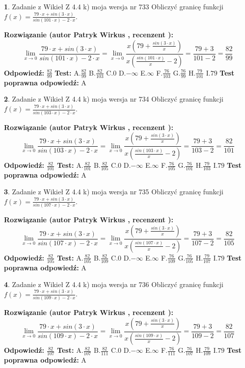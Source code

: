 \documentclass[12pt, a4paper]{article}
\theoremstyle{definition} %
\newtheorem{zad}{}
\newcommand{\zadStart}[1]{\begin{zad}#1\newline}
\newcommand{\zadStop}{\end{zad}}
\newcommand{\rozwStart}[2]{\noindent \textbf{Rozwiązanie (autor #1 , recenzent #2): }\newline}
\newcommand{\rozwStop}{\newline}
\newcommand{\odpStart}{\noindent \textbf{Odpowiedź:}\newline}
\newcommand{\odpStop}{\newline}
\newcommand{\testStart}{\noindent \textbf{Test:}\newline}
\newcommand{\testStop}{\newline}
\newcommand{\kluczStart}{\noindent \textbf{Test poprawna odpowiedź:}\newline}
\newcommand{\kluczStop}{\newline}
\begin{document}
\zadStart{Zadanie z Wikieł Z 4.4 k) moja wersja nr 733}
Obliczyć granicę funkcji $f(x)=\frac{79\cdot x +sin(3\cdot x)}{sin(101\cdot x) -2\cdot x}$.
\zadStop
\rozwStart{Patryk Wirkus}{}
$$\lim\limits_{x\to 0}\frac{79\cdot x +sin(3\cdot x)}{sin(101\cdot x) -2\cdot x}
=\lim\limits_{x\to 0}\frac{x(79+\frac{sin(3\cdot x)}{x})}{x(\frac{sin(101\cdot x)}{x}-2)}
=\frac{79+3}{101-2} = \frac{82}{99}$$
\rozwStop
\odpStart
$\frac{82}{99}$
\odpStop
\testStart
A.$\frac{82}{99}$
B.$\frac{82}{103}$
C.$0$
D.$-\infty$
E.$\infty$
F.$\frac{76}{103}$
G.$\frac{76}{99}$
H.$\frac{79}{101}$
I.$79$
\testStop
\kluczStart
A
\kluczStop



\zadStart{Zadanie z Wikieł Z 4.4 k) moja wersja nr 734}
Obliczyć granicę funkcji $f(x)=\frac{79\cdot x +sin(3\cdot x)}{sin(103\cdot x) -2\cdot x}$.
\zadStop
\rozwStart{Patryk Wirkus}{}
$$\lim\limits_{x\to 0}\frac{79\cdot x +sin(3\cdot x)}{sin(103\cdot x) -2\cdot x}
=\lim\limits_{x\to 0}\frac{x(79+\frac{sin(3\cdot x)}{x})}{x(\frac{sin(103\cdot x)}{x}-2)}
=\frac{79+3}{103-2} = \frac{82}{101}$$
\rozwStop
\odpStart
$\frac{82}{101}$
\odpStop
\testStart
A.$\frac{82}{101}$
B.$\frac{82}{105}$
C.$0$
D.$-\infty$
E.$\infty$
F.$\frac{76}{105}$
G.$\frac{76}{101}$
H.$\frac{79}{103}$
I.$79$
\testStop
\kluczStart
A
\kluczStop



\zadStart{Zadanie z Wikieł Z 4.4 k) moja wersja nr 735}
Obliczyć granicę funkcji $f(x)=\frac{79\cdot x +sin(3\cdot x)}{sin(107\cdot x) -2\cdot x}$.
\zadStop
\rozwStart{Patryk Wirkus}{}
$$\lim\limits_{x\to 0}\frac{79\cdot x +sin(3\cdot x)}{sin(107\cdot x) -2\cdot x}
=\lim\limits_{x\to 0}\frac{x(79+\frac{sin(3\cdot x)}{x})}{x(\frac{sin(107\cdot x)}{x}-2)}
=\frac{79+3}{107-2} = \frac{82}{105}$$
\rozwStop
\odpStart
$\frac{82}{105}$
\odpStop
\testStart
A.$\frac{82}{105}$
B.$\frac{82}{109}$
C.$0$
D.$-\infty$
E.$\infty$
F.$\frac{76}{109}$
G.$\frac{76}{105}$
H.$\frac{79}{107}$
I.$79$
\testStop
\kluczStart
A
\kluczStop



\zadStart{Zadanie z Wikieł Z 4.4 k) moja wersja nr 736}
Obliczyć granicę funkcji $f(x)=\frac{79\cdot x +sin(3\cdot x)}{sin(109\cdot x) -2\cdot x}$.
\zadStop
\rozwStart{Patryk Wirkus}{}
$$\lim\limits_{x\to 0}\frac{79\cdot x +sin(3\cdot x)}{sin(109\cdot x) -2\cdot x}
=\lim\limits_{x\to 0}\frac{x(79+\frac{sin(3\cdot x)}{x})}{x(\frac{sin(109\cdot x)}{x}-2)}
=\frac{79+3}{109-2} = \frac{82}{107}$$
\rozwStop
\odpStart
$\frac{82}{107}$
\odpStop
\testStart
A.$\frac{82}{107}$
B.$\frac{82}{111}$
C.$0$
D.$-\infty$
E.$\infty$
F.$\frac{76}{111}$
G.$\frac{76}{107}$
H.$\frac{79}{109}$
I.$79$
\testStop
\kluczStart
A
\kluczStop
\end{document}
